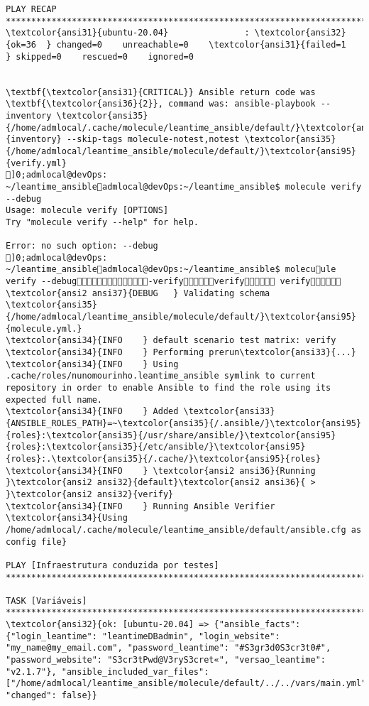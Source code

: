 \documentclass{scrartcl}
\begin{document}
\begin{Verbatim}
PLAY RECAP *******************************************************************************************************************************
\textcolor{ansi31}{ubuntu-20.04}               : \textcolor{ansi32}{ok=36  } changed=0    unreachable=0    \textcolor{ansi31}{failed=1   } skipped=0    rescued=0    ignored=0


\textbf{\textcolor{ansi31}{CRITICAL}} Ansible return code was \textbf{\textcolor{ansi36}{2}}, command was: ansible-playbook --inventory \textcolor{ansi35}{/home/admlocal/.cache/molecule/leantime_ansible/default/}\textcolor{ansi95}{inventory} --skip-tags molecule-notest,notest \textcolor{ansi35}{/home/admlocal/leantime_ansible/molecule/default/}\textcolor{ansi95}{verify.yml}
]0;admlocal@devOps: ~/leantime_ansibleadmlocal@devOps:~/leantime_ansible$ molecule verify --debug
Usage: molecule verify [OPTIONS]
Try "molecule verify --help" for help.

Error: no such option: --debug
]0;admlocal@devOps: ~/leantime_ansibleadmlocal@devOps:~/leantime_ansible$ molecuule verify --debug-verifyverify verify
\textcolor{ansi2 ansi37}{DEBUG   } Validating schema \textcolor{ansi35}{/home/admlocal/leantime_ansible/molecule/default/}\textcolor{ansi95}{molecule.yml.}
\textcolor{ansi34}{INFO    } default scenario test matrix: verify
\textcolor{ansi34}{INFO    } Performing prerun\textcolor{ansi33}{...}
\textcolor{ansi34}{INFO    } Using .cache/roles/nunomourinho.leantime_ansible symlink to current repository in order to enable Ansible to find the role using its expected full name.
\textcolor{ansi34}{INFO    } Added \textcolor{ansi33}{ANSIBLE_ROLES_PATH}=~\textcolor{ansi35}{/.ansible/}\textcolor{ansi95}{roles}:\textcolor{ansi35}{/usr/share/ansible/}\textcolor{ansi95}{roles}:\textcolor{ansi35}{/etc/ansible/}\textcolor{ansi95}{roles}:.\textcolor{ansi35}{/.cache/}\textcolor{ansi95}{roles}
\textcolor{ansi34}{INFO    } \textcolor{ansi2 ansi36}{Running }\textcolor{ansi2 ansi32}{default}\textcolor{ansi2 ansi36}{ > }\textcolor{ansi2 ansi32}{verify}
\textcolor{ansi34}{INFO    } Running Ansible Verifier
\textcolor{ansi34}{Using /home/admlocal/.cache/molecule/leantime_ansible/default/ansible.cfg as config file}

PLAY [Infraestrutura conduzida por testes] ***********************************************************************************************

TASK [Variáveis] *************************************************************************************************************************
\textcolor{ansi32}{ok: [ubuntu-20.04] => {"ansible_facts": {"login_leantime": "leantimeDBadmin", "login_website": "my_name@my_email.com", "password_leantime": "#S3gr3d0S3cr3t0#", "password_website": "S3cr3tPwd@V3ryS3cret«", "versao_leantime": "v2.1.7"}, "ansible_included_var_files": ["/home/admlocal/leantime_ansible/molecule/default/../../vars/main.yml"], "changed": false}}


\end{Verbatim}
\end{document}
